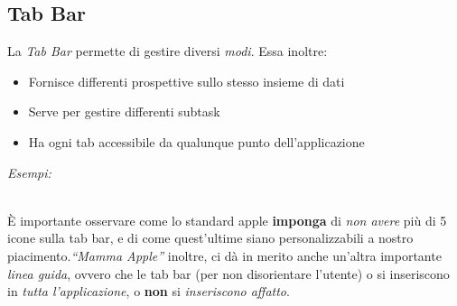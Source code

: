 \documentclass[oneside]{book}
\begin{document}
		\subsection{Tab Bar} \label{sez:Tabbar}
			La \emph{Tab Bar} permette di gestire diversi \emph{modi}. Essa inoltre:
			\begin{itemize}
			\item Fornisce differenti prospettive sullo stesso insieme di dati
			\item Serve per gestire differenti subtask
			\item Ha ogni tab accessibile da qualunque punto dell’applicazione
			\end{itemize}
			\emph{Esempi:}
			\begin{figure}[htbp]
			\centering%
			\qquad\qquad
			\end{figure}
			\\
			È importante osservare come lo standard apple \textbf{imponga} di \emph{non avere} più di 5 icone sulla tab bar, e di come quest'ultime siano personalizzabili a nostro piacimento.\emph{``Mamma Apple''} inoltre, ci dà in merito anche un'altra importante \emph{linea guida}, ovvero che le tab bar (per non disorientare l'utente) o si inseriscono in \emph{tutta l'applicazione}, o \textbf{non} si \emph{inseriscono affatto}. \\
\end{document}
